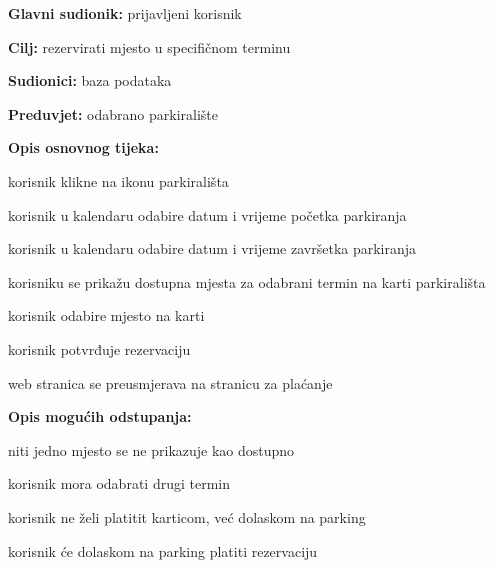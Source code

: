 					\noindent {}
					\begin{packed_item}
						
						\item \textbf{Glavni sudionik: }prijavljeni korisnik
						\item  \textbf{Cilj:} rezervirati mjesto u specifičnom terminu
						\item  \textbf{Sudionici:} baza podataka
						\item  \textbf{Preduvjet:} odabrano parkiralište
						\item  \textbf{Opis osnovnog tijeka:}
						
						\item[] \begin{packed_enum}
							
							\item korisnik klikne na ikonu parkirališta
							\item korisnik u kalendaru odabire datum i vrijeme početka parkiranja
							\item korisnik u kalendaru odabire datum i vrijeme završetka parkiranja 
							\item korisniku se prikažu dostupna mjesta za odabrani termin na karti parkirališta
							\item korisnik odabire mjesto na karti
							\item korisnik potvrđuje rezervaciju
							\item web stranica se preusmjerava na stranicu za plaćanje
						\end{packed_enum}
						
						\item  \textbf{Opis mogućih odstupanja:}
						
						\item[] \begin{packed_item}
							
							\item[4.a]niti jedno mjesto se ne prikazuje kao dostupno
							\item[] \begin{packed_enum}
								
								\item korisnik mora odabrati drugi termin
								
								
							\end{packed_enum}
							
							\item[5.a] korisnik ne želi platitit karticom, već dolaskom na parking
							\item[] \begin{packed_enum}
								
								\item korisnik će dolaskom na parking platiti rezervaciju
								
								
							\end{packed_enum}
							
						\end{packed_item}
					\end{packed_item}
					
